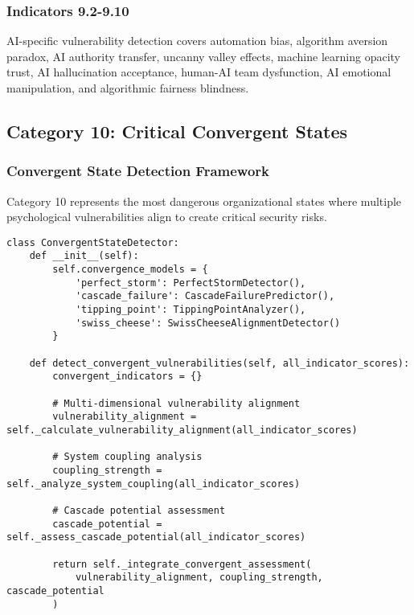 \documentclass[11pt, onecolumn]{article}
\begin{document}
\subsubsection{Indicators 9.2-9.10}

AI-specific vulnerability detection covers automation bias, algorithm aversion paradox, AI authority transfer, uncanny valley effects, machine learning opacity trust, AI hallucination acceptance, human-AI team dysfunction, AI emotional manipulation, and algorithmic fairness blindness.

\subsection{Category 10: Critical Convergent States}

\subsubsection{Convergent State Detection Framework}

Category 10 represents the most dangerous organizational states where multiple psychological vulnerabilities align to create critical security risks.

\begin{lstlisting}
class ConvergentStateDetector:
    def __init__(self):
        self.convergence_models = {
            'perfect_storm': PerfectStormDetector(),
            'cascade_failure': CascadeFailurePredictor(),
            'tipping_point': TippingPointAnalyzer(),
            'swiss_cheese': SwissCheeseAlignmentDetector()
        }
        
    def detect_convergent_vulnerabilities(self, all_indicator_scores):
        convergent_indicators = {}
        
        # Multi-dimensional vulnerability alignment
        vulnerability_alignment = self._calculate_vulnerability_alignment(all_indicator_scores)
        
        # System coupling analysis
        coupling_strength = self._analyze_system_coupling(all_indicator_scores)
        
        # Cascade potential assessment
        cascade_potential = self._assess_cascade_potential(all_indicator_scores)
        
        return self._integrate_convergent_assessment(
            vulnerability_alignment, coupling_strength, cascade_potential
        )
\end{lstlisting}
\end{document}

